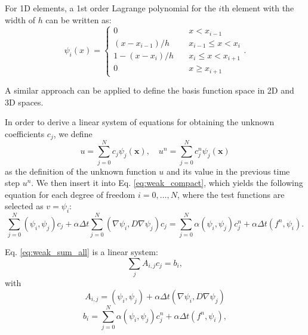 For 1D elements, a 1st order Lagrange polynomial for the $i$th element with the width of $h$ can be written as:
\begin{equation}
\psi_{i}(x)=\left\{\begin{array}{cc}{0} & {\quad x<x_{i-1}} \\ {\left(x-x_{i-1}\right) / h} & {\quad x_{i-1} \leq x<x_{i}} \\ {1-\left(x-x_{i}\right) / h} & {\quad x_{i} \leq x<x_{i+1}} \\ {0} & {\quad x \geq x_{i+1}}\end{array}\right. .
\end{equation}

A similar approach can be applied to define the basis function space in 2D and 3D spaces.

In order to derive a linear system of equations for obtaining the unknown coefficients $c_j$, we define
\begin{equation} \label{eq:u_definition}
u=\sum_{j=0}^{N} c_{j} \psi_{j}(\boldsymbol{x}), \quad u^{n}=\sum_{j=0}^{N} c_{j}^{n} \psi_{j}(\boldsymbol{x})
\end{equation}
\noindent as the definition of the unknown function $u$ and its value in the previous time step $u^n$. We then insert it into Eq. \ref{eq:weak_compact}, which yields the following equation for each degree of freedom $i=0, \ldots, N$, where the test functions are selected as $v = \psi_i$:
\begin{equation} \label{eq:weak_sum_all}
\sum_{j=0}^{N}\left(\psi_{i}, \psi_{j}\right) c_{j} + \alpha \Delta t \sum_{j=0}^{N}\left(\nabla \psi_{i}, D \nabla \psi_{j}\right) c_{j} =\sum_{j=0}^{N} \alpha \left(\psi_{i}, \psi_{j}\right) c_{j}^{n}+\alpha\Delta t\left(f^{n}, \psi_{i}\right).
\end{equation}

Eq. \ref{eq:weak_sum_all} is a linear system:
\begin{equation} \label{eq:linear_system}
\sum_{j} A_{i, j} c_{j}=b_{i},
\end{equation}
with
\begin{equation} \label{eq:system_a}
A_{i, j}=\left(\psi_{i}, \psi_{j}\right) + \alpha \Delta t \left(\nabla \psi_{i}, D \nabla \psi_{j}\right)
\end{equation}
\begin{equation} \label{eq:system_b}
b_{i}=\sum_{j=0}^{N}\alpha \left(\psi_{i}, \psi_{j}\right) c_{j}^{n}+\alpha \Delta t\left(f^{n}, \psi_{i}\right),
\end{equation}

